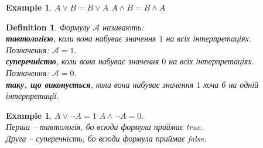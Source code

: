\documentclass[a4paper, 14pt]{extarticle}
\theoremstyle{theoremdd}
\theoremstyle{theoremdd}
\newtheorem{definition}[theorem]{Definition}
\theoremstyle{theoremdd}
\theoremstyle{theoremdd}
\theoremstyle{theoremdd}
\newtheorem{example}[theorem]{Example}
\theoremstyle{theoremdd}
\theoremstyle{theoremdd}
\theoremstyle{theoremdd}
\theoremstyle{theoremdd}
\theoremstyle{theoremdd}
\theoremstyle{theoremdd}
\theoremstyle{theoremdd}
\theoremstyle{theoremdd}
\theoremstyle{theoremdd}
\theoremstyle{theoremdd}
\begin{document}
\begin{example}
$A \vee B = B \vee A$ \hspace{1cm} $A \wedge B = B \wedge A$
\end{example}

\begin{definition}
Формулу $\mathcal{A}$ називають:\\
\textbf{тавтологією}, коли вона набуває значення $1$ на всіх інтерпретаціях.\\
Позначення: $\mathcal{A} = 1$.
\bigskip \\
\textbf{суперечністю}, коли вона набуває значення $0$ на всіх інтерпретаціях.\\
Позначення: $\mathcal{A} = 0$.
\bigskip \\
\textbf{таку, що виконується}, коли вона набуває значення $1$ хоча б на одній інтерпретації.
\end{definition}

\begin{example}
$A \vee \neg A = 1$ \hspace{1cm} $A \wedge \neg A = 0$.\\
Перша -- тавтологія, бо всюди формула приймає true.\\
Друга -- суперечність, бо всюди формула приймає false.
\end{example}
\end{document}
